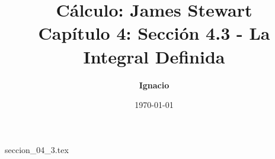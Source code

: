 \documentclass[11pt,spanish,oneside]{report}
\title{\textbf{Cálculo: James Stewart} \\ \Large Capítulo 4: Sección 4.3 - La Integral Definida}
\author{\textbf{Ignacio}}
\date{\today}
\begin{document}
\maketitle

{seccion_04_3.tex}
\end{document}
